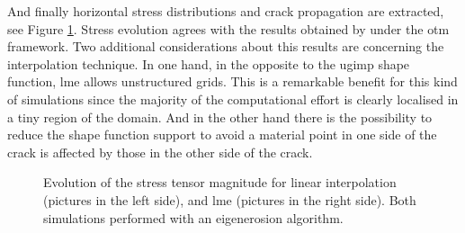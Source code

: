 \message{ !name(2020_EFM_MPM_Eigensoftening.tex)}\documentclass[preprint,12pt,a4paper]{elsarticle}
\begin{document}
And finally horizontal stress distributions and crack propagation are
extracted, see Figure \ref{fig:Stress-vs-damage-impact-test}. Stress
evolution agrees with the results obtained by \cite{Navas_2017_ES}
under the \acrshort{otm} framework. Two additional considerations about
this results are concerning the interpolation technique. In one hand,
in the opposite to the \acrshort{ugimp} shape function, \acrshort{lme}
allows unstructured grids. This is a remarkable benefit for this kind
of simulations since the majority of the computational effort is
clearly localised in a tiny region of the domain. And in the other
hand there is the possibility to reduce the shape function support to avoid
a material point in one side of the crack is affected by those in the
other side of the crack. 
\begin{figure}
\centering
{}
\caption{Evolution of the stress tensor magnitude for linear
  interpolation (pictures in the left side), and \acrshort{lme}
  (pictures in the right side). Both simulations performed with an
  eigenerosion algorithm.}
\label{fig:Stress-vs-damage-impact-test}
\end{figure}
\end{document}
